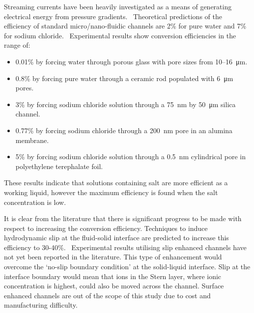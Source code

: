 \documentclass[10pt,final,journal]{IEEEtran}
\begin{document}
    Streaming currents have been heavily investigated as a means of generating electrical energy from pressure gradients.~\cite{Chang2009,Daiguji2006,Daiguji2004b,Davidson2008a,Davidson2008,CherngHon2012,Jiao2014,Lu2006,Olthuis2005,Osterle1964,Pennathur2007,Ren2008a,VanderHeyden2006,Heyden2007,Xie2008,Yang2003}
    Theoretical predictions of the efficiency of standard micro/nano-fluidic channels are 2\% for pure water and 7\% for sodium chloride.~\cite{VanderHeyden2006}
    Experimental results show conversion efficiencies in the range of:
    \begin{itemize}
        \item 0.01\% by forcing water through porous glass with pore sizes from 10\thinspace--\SI{16}{\micro\metre}.~\cite{Yang2003}
        \item 0.8\% by forcing pure water through a ceramic rod populated with \SI{6}{\micro\metre} pores.~\cite{Yang2004}
        \item 3\% by forcing sodium chloride solution through a \SI{75}{\nano\metre} by \SI{50}{\micro\metre} silica channel.~\cite{Heyden2007}
        \item 0.77\% by forcing sodium chloride through a \SI{200}{\nano\metre} pore in an alumina membrane.~\cite{Lu2006}
        \item 5\% by forcing sodium chloride solution through a \SI{0.5}{\nano\metre} cylindrical pore in polyethylene terephalate foil.~\cite{Xie2008}
    \end{itemize}
    These results indicate that solutions containing salt are more efficient as a working liquid, however the maximum efficiency is found when the salt concentration is low.~\cite{VanderHeyden2006}

    It is clear from the literature that there is significant progress to be made with respect to increasing the conversion efficiency.
    Techniques to induce hydrodynamic slip at the fluid-solid interface are predicted to increase this efficiency to 30-40\%.~\cite{Davidson2008a, Ren2008a}
    Experimental results utilising slip enhanced channels have not yet been reported in the literature.
    This type of enhancement would overcome the `no-slip boundary condition' at the solid-liquid interface.
    Slip at the interface boundary would mean that ions in the Stern layer, where ionic concentration is highest, could also be moved across the channel.
    Surface enhanced channels are out of the scope of this study due to cost and manufacturing difficulty.
\end{document}
